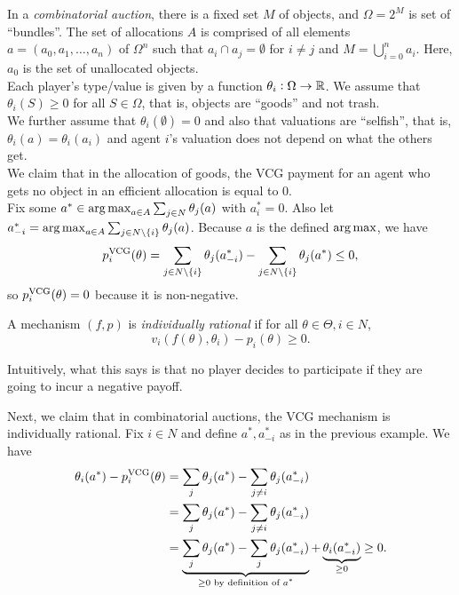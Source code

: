 		\begin{fex}
			In a \emph{combinatorial auction}, there is a fixed set $M$ of objects, and $\Omega = 2^M$ is set of ``bundles''. The set of allocations $A$ is comprised of all elements $a = (a_0,a_1,\ldots,a_n)$ of $\Omega^n$ such that $a_i \cap a_j = \emptyset$ for $i \ne j$ and $M = \bigcup_{i=0}^n a_i$. Here, $a_0$ is the set of unallocated objects. \\
			Each player's type/value is given by a function $\theta_i : \Omega \to \mathbb{R}$. We assume that $\theta_i(S) \ge 0$ for all $S \in \Omega$, that is, objects are ``goods'' and not trash.\\
			We further assume that $\theta_i(\emptyset) = 0$ and also that valuations are ``selfish'', that is, $\theta_i(a) = \theta_i(a_i)$ and agent $i$'s valuation does not depend on what the others get.\\

			We claim that in the allocation of goods, the VCG payment for an agent who gets no object in an efficient allocation is equal to $0$.\\
			Fix some $a^* \in \operatorname*{arg\,max}_{a \in A} \sum_{j \in N} \theta_j(a)$ with $a^*_i = 0$. Also let $a^*_{-i} = \operatorname*{arg\,max}_{a \in A} \sum_{j \in N \setminus \{i\}} \theta_j(a)$. Because $a$ is the defined $\operatorname*{arg\,max}$, we have
			\[ p_i^{\text{VCG}}(\theta) = \sum_{j \in N \setminus \{i\}} \theta_j(a^*_{-i}) - \sum_{j \in N \setminus \{i\}} \theta_j(a^*) \le 0, \]
			so $p_i^{\text{VCG}}(\theta) = 0$ because it is non-negative.
		\end{fex}

		\begin{fdef}
			A mechanism $(f,p)$ is \emph{individually rational} if for all $\theta \in \Theta, i \in N$,
			\[ v_i(f(\theta),\theta_i) - p_i(\theta) \ge 0. \]
		\end{fdef}
		Intuitively, what this says is that no player decides to participate if they are going to incur a negative payoff.

		\begin{fex}
			Next, we claim that in combinatorial auctions, the VCG mechanism is individually rational. Fix $i \in N$ and define $a^*,a^*_{-i}$ as in the previous example. We have
			\begin{align*}
				\theta_i(a^*) - p_i^{\text{VCG}}(\theta) &= \sum_{j} \theta_j(a^*) - \sum_{j \ne i} \theta_j(a_{-i}^*) \\
					&= \sum_{j} \theta_j(a^*) - \sum_{j \ne i} \theta_j(a_{-i}^*) \\
					&= \underbrace{\sum_{j} \theta_j(a^*) - \sum_{j} \theta_j(a_{-i}^*)}_{\ge 0\text{ by definition of $a^*$}} + \underbrace{\theta_i(a_{-i}^*)}_{\ge 0} \ge 0.
			\end{align*}
		\end{fex}

